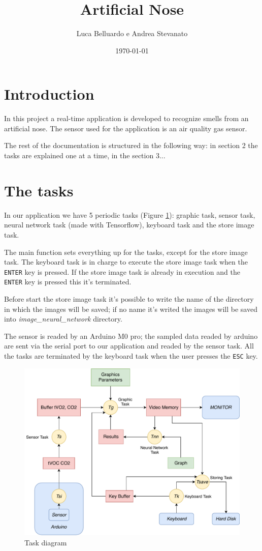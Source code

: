 \documentclass[12pt]{article}
\title{Artificial Nose}
\author{Luca Belluardo e Andrea Stevanato}
\date{\today}
\begin{document}
\section{Introduction}
In this project a real-time application is developed to recognize smells from an
artificial nose. The sensor used for the application is an air quality gas sensor.

The rest of the documentation is structured in the following way: in section
2 the tasks are explained one at a time, in the section 3...

\section{The tasks}
In our application we have 5 periodic tasks (Figure \ref{tdiagram}): graphic
task, sensor task, neural network task (made with Tensorflow), keyboard task
and the store image task.

The main function sets everything up for the tasks, except for the store
image task. The keyboard task is in charge to execute the store image task
when the \texttt{ENTER} key is pressed. If the store image task is already in
execution and the \texttt{ENTER} key is pressed this it's terminated.

Before start the store image task it's possible to write the name of the
directory in which the images will be saved; if no name it's writed the
images will be saved into \textit{image\_neural\_network} directory.

The sensor is readed by an Arduino M0 pro; the sampled data readed by arduino
are sent via the serial port to our application and readed by the sensor
task. All the tasks are terminated by the keyboard task when the user presses
the \texttt{ESC} key.

\begin{figure}[!t]
    \includegraphics[width=\textwidth]{diagram.pdf}
    \caption{Task diagram}
    \label{tdiagram}
\end{figure}
\end{document}

